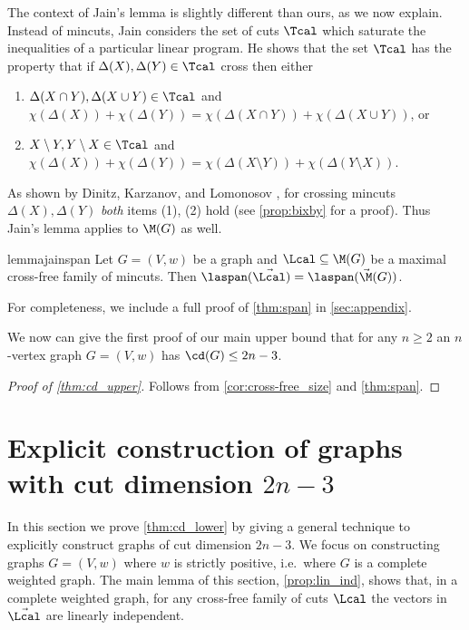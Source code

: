 The context of Jain's lemma is slightly different than ours, as we now explain.  Instead of mincuts, Jain considers the set of cuts
$\Tcal$ which saturate the inequalities of a particular linear program.  He shows that the set $\Tcal$ has the property that if $\Delta(X),\Delta(Y) \in \Tcal$
cross then either
\begin{enumerate}
\item $\Delta(X \cap Y), \Delta(X \cup Y) \in \Tcal$ and $\chi(\Delta(X)) + \chi(\Delta(Y)) = \chi(\Delta(X \cap Y)) + \chi(\Delta(X \cup Y))$, or
\item $X \setminus Y, Y \setminus X \in \Tcal$ and $\chi(\Delta(X)) + \chi(\Delta(Y)) = \chi(\Delta(X \setminus Y)) + \chi(\Delta(Y \setminus X)).$
\end{enumerate}
As shown by Dinitz, Karzanov, and Lomonosov \cite{DKL76}, for crossing mincuts $\Delta(X),\Delta(Y)$ \emph{both} items (1), (2) hold (see \cref{prop:bixby} for a proof).
Thus Jain's lemma applies to $\M(G)$ as well.
\begin{restatable}{lemma}{jainspan}\label{thm:span}
Let $G = (V,w)$ be a graph and $\Lcal \subseteq \M(G)$ be a maximal cross-free family of mincuts.
Then $\laspan(\vec{\Lcal}) = \laspan(\vec{\M}(G))$.
\end{restatable}
For completeness, we include a full proof of \cref{thm:span} in \cref{sec:appendix}.

We now can give the first proof of our main upper bound that for any $n\ge 2$ an $n$-vertex graph $G=(V,w)$ has $\cd(G) \le 2n-3$.

\begin{proof}[Proof of \cref{thm:cd_upper}]
Follows from \cref{cor:cross-free_size} and \cref{thm:span}.
\end{proof}

%

\section{Explicit construction of graphs with cut dimension $2n-3$}\label{sec:construction}
In this section we prove \cref{thm:cd_lower} by giving a general technique to explicitly construct graphs of cut dimension $2n-3$.  We focus
on constructing graphs $G = (V,w)$ where $w$ is strictly positive, i.e.\ where $G$ is a complete weighted graph.
The main lemma of this section, \cref{prop:lin_ind}, shows that, in a complete weighted graph, for any cross-free family of cuts $\Lcal$
the vectors in $\vec{\Lcal}$ are linearly independent.

